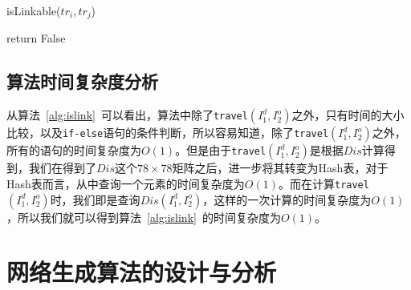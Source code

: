\begin{algorithm}[htbp]
\SetAlgoLined
{}
\caption{isLinkable($tr_i,tr_j$)}
\label{alg:islink}
\BlankLine
{}
return False\;
\end{algorithm}

\subsection{算法时间复杂度分析}
从算法~\ref{alg:islink}~可以看出，算法中除了\texttt{travel$(I_1^d, I_2^o)$}之外，只有时间的大小比较，以及\texttt{if-else}语句的条件判断，所以容易知道，除了\texttt{travel$(I_1^d, I_2^o)$}之外，所有的语句的时间复杂度为$O(1)$。但是由于\texttt{travel$(I_1^d, I_2^o)$}是根据$Dis$计算得到，我们在得到了$Dis$这个$78\times 78$矩阵之后，进一步将其转变为Hash表，对于Hash表而言，从中查询一个元素的时间复杂度为$O(1)$。而在计算\texttt{travel$(I_1^d, I_2^o)$}时，我们即是查询$Dis(I_1^d, I_2^o)$，这样的一次计算的时间复杂度为$O(1)$，所以我们就可以得到算法~\ref{alg:islink}~的时间复杂度为$O(1)$。

\section{网络生成算法的设计与分析}

